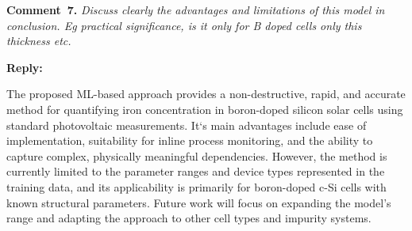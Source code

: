 \documentclass[a4paper,fleqn]{cas-sc}
\begin{document}
%
%
%




\vspace{1cm}
\noindent
\textcolor[rgb]{0.00,0.50,1.00}{\textbf{Comment~7.}}
\emph{Discuss clearly the advantages and limitations of this model in conclusion. Eg practical significance, is it only for B doped cells only this thickness etc.}

\noindent
\textcolor[rgb]{0.51,0.00,0.00}{\textbf{Reply:}}


The proposed ML-based approach provides a non-destructive, rapid, and accurate method for quantifying iron concentration in boron-doped silicon solar cells using standard photovoltaic measurements.
It`s main advantages include ease of implementation, suitability for inline process monitoring, and the ability to capture complex, physically meaningful dependencies.
However, the method is currently limited to the parameter ranges and device types represented in the training data, and its applicability is primarily for boron-doped c-Si cells with known structural parameters.
Future work will focus on expanding the model’s range and adapting the approach to other cell types and impurity systems.


\textcolor[rgb]{1.00,0.07,0.00}{
\hl{}}



\end{document}
